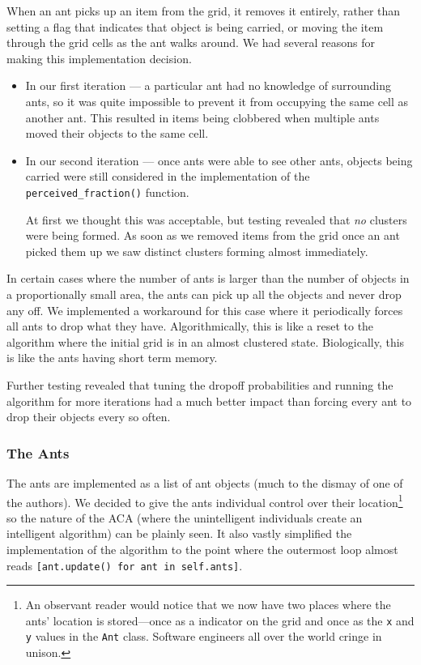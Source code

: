 \documentclass[12pt]{article}
\begin{document}
When an ant picks up an item from the grid, it removes it entirely, rather than setting a flag that indicates that object is being carried, or moving the item through the grid cells as the ant walks around.
We had several reasons for making this implementation decision.
\begin{itemize}
    \item In our first iteration --- a particular ant had no knowledge of surrounding ants, so it was quite impossible to prevent it from occupying the same cell as another ant.
          This resulted in items being clobbered when multiple ants moved their objects to the same cell.
    \item In our second iteration --- once ants were able to see other ants, objects being carried were still considered in the implementation of the \texttt{perceived_fraction()} function.

          At first we thought this was acceptable, but testing revealed that \textit{no} clusters were being formed. As soon as we removed items from the grid once an ant picked them up we saw distinct clusters forming almost immediately.
\end{itemize}

In certain cases where the number of ants is larger than the number of objects in a proportionally small area, the ants can pick up all the objects and never drop any off.
We implemented a workaround for this case where it periodically forces all ants to drop what they have.
Algorithmically, this is like a reset to the algorithm where the initial grid is in an almost clustered state.
Biologically, this is like the ants having short term memory.

Further testing revealed that tuning the dropoff probabilities and running the algorithm for more iterations had a much better impact than forcing every ant to drop their objects every so often.

\subsubsection{The Ants}
The ants are implemented as a list of ant objects (much to the dismay of one of the authors).
We decided to give the ants individual control over their location\footnote{An observant reader would notice that we now have two places where the ants' location is stored---once as a indicator on the grid and once as the \texttt{x} and \texttt{y} values in the \texttt{Ant} class. Software engineers all over the world cringe in unison.} so the nature of the ACA (where the unintelligent individuals create an intelligent algorithm) can be plainly seen.
It also vastly simplified the implementation of the algorithm to the point where the outermost loop almost reads \texttt{[ant.update() for ant in self.ants]}.
\end{document}
